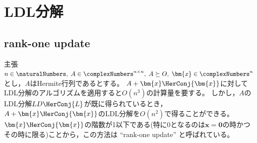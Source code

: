 \chapter{LDL分解}
    \section{rank-one update}
        \begin{itembox}[l]{主張}
            $n\in\naturalNumbers,\;A\in\complexNumbers^{n\times n},\;A\succeq O,\;\bm{x}\in\complexNumbers^n$とし，$A$はHermite行列であるとする。
            $A+\bm{x}\HerConj{\bm{x}}$に対してLDL分解のアルゴリズムを適用すると$O(n^3)$の計算量を要する。
            しかし，$A$のLDL分解$LD\HerConj{L}$が既に得られているとき，$A+\bm{x}\HerConj{\bm{x}}$のLDL分解を$O(n^2)$で得ることができる。
            $\bm{x}\HerConj{\bm{x}}$の階数が1以下である(特に0となるのは$\bm{x}=\bm{0}$の時かつその時に限る)ことから，この方法は ``rank-one update'' と呼ばれている。
        \end{itembox}
